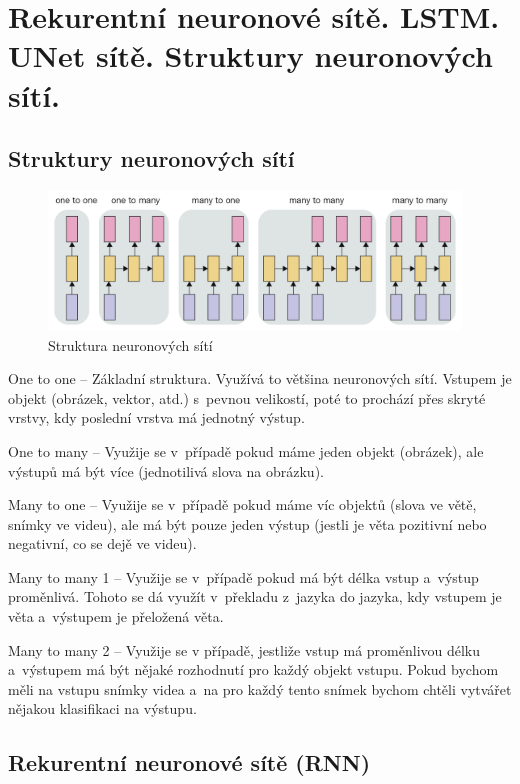 \clearpage
\section{Rekurentní neuronové sítě. LSTM. UNet sítě. Struktury neuronových sítí.}

\subsection{Struktury neuronových sítí}

\begin{figure}[h]
    \centering
	\includegraphics[height=10em]{images/09_NN-struktura.png}
    \caption{Struktura neuronových sítí}
    \label{NNS}
\end{figure}

One to one -- Základní struktura. 
Využívá to většina neuronových sítí. 
Vstupem je objekt (obrázek, vektor, atd.) s~pevnou velikostí, poté to prochází přes skryté vrstvy, kdy poslední vrstva má jednotný výstup.

One to many -- Využije se v~případě pokud máme jeden objekt (obrázek), ale výstupů má být více (jednotilivá slova na obrázku).

Many to one -- Využije se v~případě pokud máme víc objektů (slova ve větě, snímky ve videu), ale má být pouze jeden výstup (jestli je věta pozitivní nebo negativní, co se dejě ve videu).

Many to many 1 -- Využije se v~případě pokud má být délka vstup a~výstup proměnlivá.
Tohoto se dá využít v~překladu z~jazyka do jazyka, kdy vstupem je věta a~výstupem je přeložená věta.

Many to many 2 -- Využije se v případě, jestliže vstup má proměnlivou délku a~výstupem má být nějaké rozhodnutí pro každý objekt vstupu.
Pokud bychom měli na vstupu snímky videa a~na pro každý tento snímek bychom chtěli vytvářet nějakou klasifikaci na výstupu.

\subsection{Rekurentní neuronové sítě (RNN)}

